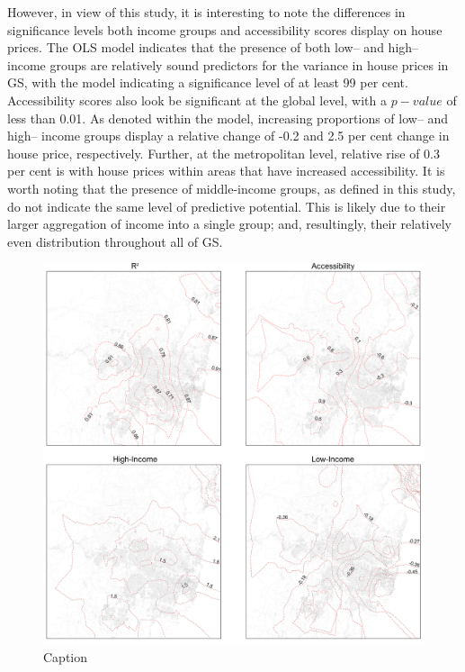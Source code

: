 However, in view of this study, it is interesting to note the differences in significance levels both income groups and accessibility scores display on house prices. The OLS model indicates that the presence of both low-- and high-- income groups are relatively sound predictors for the variance in house prices in GS, with the model indicating a significance level of at least 99 per cent. Accessibility scores also look be significant at the global level, with a $p-value$ of less than 0.01. As denoted within the model, increasing proportions of low-- and high-- income groups display a relative change of -0.2 and 2.5 per cent change in house price, respectively. Further, at the metropolitan level, relative rise of 0.3 per cent is with house prices within areas that have increased accessibility. It is worth noting that the presence of middle-income groups, as defined in this study, do not indicate the same level of predictive potential. This is likely due to their larger aggregation of income into a single group; and, resultingly, their relatively even distribution throughout all of GS. \\

\begin{figure}[!ht]
    \centering
    \includegraphics[width=1\textwidth]{body/figures/access_contour.png}
    \caption{Caption}
    \label{fig:gwr_accessibility_contour}
\end{figure}


